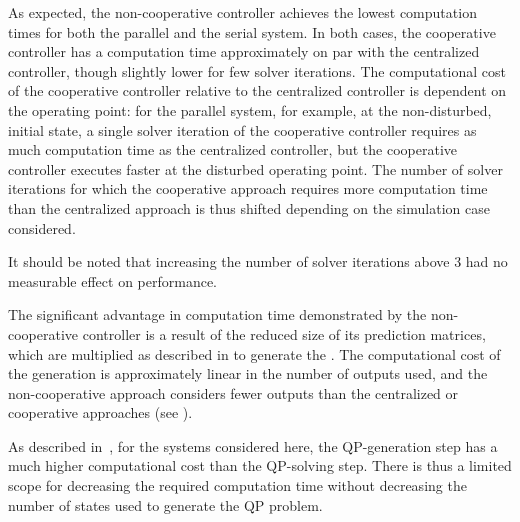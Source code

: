 As expected, the non-cooperative controller achieves the lowest computation times for both the parallel and the serial system.
In both cases, the cooperative controller has a computation time approximately on par with the centralized controller, though slightly lower for few solver iterations.
The computational cost of the cooperative controller relative to the centralized controller is dependent on the operating point: for the parallel system, for example, at the non-disturbed, initial state, a single solver iteration of the cooperative controller requires as much computation time as the centralized controller, but the cooperative controller executes faster at the disturbed operating point.
The number of solver iterations for which the cooperative approach requires more computation time than the centralized approach is thus shifted depending on the simulation case considered.

It should be noted that increasing the number of solver iterations above 3 had no measurable effect on performance.

The significant advantage in computation time demonstrated by the non-cooperative controller is a result of the reduced size of its prediction matrices, which are multiplied as described in  to generate the .
The computational cost of the  generation is approximately linear in the number of outputs used, and the non-cooperative approach considers fewer outputs than the centralized or cooperative approaches (see ).

As described in~\cite{Jones2016}, for the systems considered here, the QP-generation step has a much higher computational cost than the QP-solving step.
%
There is thus a limited scope for decreasing the required computation time without decreasing the number of states used to generate the QP problem.

